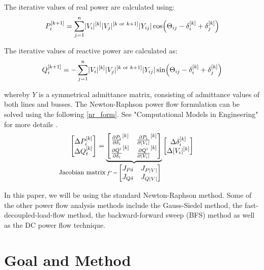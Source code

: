 \documentclass[a4paper,10pt]{report}
\begin{document}
The iterative values of real power are calculated using:
\begin{equation}
	P_i^{[k+1]}=\sum^{n}_{j=1}\lvert V_i\rvert^{[k]}\lvert V_j\rvert^{[k \text{ or } k+1]}\lvert Y_{ij}\rvert\cos\Bigl(\Theta_{ij}-\delta_i^{[k]}+\delta_j^{[k]}\Bigr)
\end{equation}

The iterative values of reactive power are calculated as:
\begin{equation}
	Q_i^{[k+1]}=-\sum^{n}_{j=1}\lvert V_i\rvert^{[k]}\lvert V_j\rvert^{[k \text{ or } k+1]}\lvert Y_{ij}\rvert\sin\Bigl(\Theta_{ij}-\delta_i^{[k]}+\delta_j^{[k]}\Bigr)
\end{equation}

whereby $Y$ is a symmetrical admittance matrix, consisting of admittance values of both lines and busses. The Newton-Raphson power flow formulation can be solved using the following \cref{nr_form}. See "Computational Models in Engineering" for more details \cite{Albadi2020}.
\begin{equation}\label{nr_form}
	\begin{bmatrix}
		\Delta P_i^{[k]}\\
		\Delta Q_t^{[k]}
	\end{bmatrix}
	=
	\underbrace{
		\begin{bmatrix}
			\frac{\partial P_i}{\partial \delta_i}^{[k]} & \frac{\partial P_i}{\partial \lvert V_i \rvert}^{[k]}\\
			\frac{\partial Q^i}{\partial \delta_i}^{[k]} & \frac{\partial Q^i}{\partial \lvert V_i \rvert}^{[k]}
		\end{bmatrix}
	}_{\llap{\small Jacobian matrix\:}
		f'\,=\,
		\begin{bmatrix}
			J_{P\delta} & J_{P\lvert V\rvert}\\
			J_{Q\delta} & J_{Q\lvert V\rvert}
		\end{bmatrix}
	}
	\begin{bmatrix}
		\Delta\delta_i^{[k]}\\
		\Delta\lvert V_i \rvert^{[k]}
	\end{bmatrix}
\end{equation}

In this paper, we will be using the standard Newton-Raphson method. Some of the other power flow analysis methods include the Gauss-Siedel method, the fast-decoupled-load-flow method, the backward-forward sweep (BFS) method as well as the DC power flow technique. 


\chapter{Goal and Method}
\end{document}

